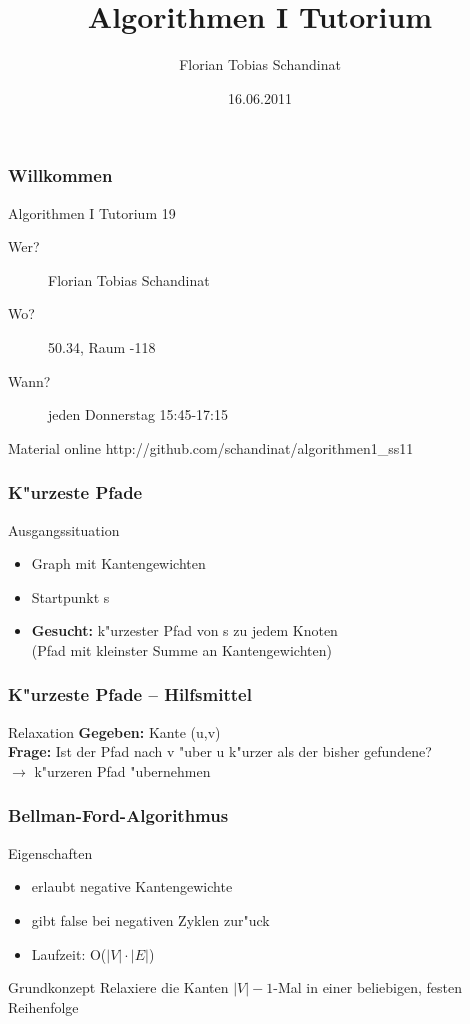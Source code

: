 \documentclass{beamer}
\title{Algorithmen I Tutorium}
\author{Florian Tobias Schandinat}
\date{16.06.2011}
\institute{FTS}
\begin{document}
\begin{frame}
\frametitle{Willkommen}
\begin{block}{Algorithmen I Tutorium 19}
\begin{description}
\item[Wer?] Florian Tobias Schandinat\\
\item[Wo?] 50.34, Raum -118\\
\item[Wann?] jeden Donnerstag 15:45-17:15
\end{description}
\end{block}

\begin{block}{Material online}
http://github.com/schandinat/algorithmen1\_ss11
\end{block}
\end{frame}


\begin{frame}
\frametitle{K"urzeste Pfade}

\begin{block}{Ausgangssituation}
\begin{itemize}
\item Graph mit Kantengewichten
\item Startpunkt s
\item \textbf{Gesucht:} k"urzester Pfad von s zu jedem Knoten\\(Pfad mit kleinster Summe an Kantengewichten)
\end{itemize}
\end{block}
\end{frame}


\begin{frame}
\frametitle{K"urzeste Pfade -- Hilfsmittel}

\begin{block}{Relaxation}
\textbf{Gegeben:} Kante (u,v)\\
\textbf{Frage:} Ist der Pfad nach v "uber u k"urzer als der bisher gefundene?\\
$\longrightarrow$ k"urzeren Pfad "ubernehmen
\end{block}
\end{frame}


\begin{frame}
\frametitle{Bellman-Ford-Algorithmus}
\begin{block}{Eigenschaften}
\begin{itemize}
\item erlaubt negative Kantengewichte
\item gibt false bei negativen Zyklen zur"uck
\item Laufzeit: O($|V| \cdot |E|$)
\end{itemize}
\end{block}

\begin{alertblock}{Grundkonzept}
Relaxiere die Kanten $|V| - 1$-Mal in einer beliebigen, festen Reihenfolge
\end{alertblock}
\end{frame}
\end{document}
